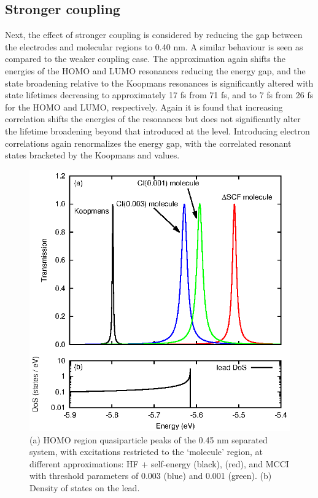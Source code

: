 \subsection{Stronger coupling}
Next, the effect of stronger coupling is considered by reducing the gap
between the electrodes and molecular regions to 0.40 nm.
A similar behaviour is seen as compared to the weaker coupling case. The
\dscf approximation again shifts the energies of the HOMO and LUMO
resonances reducing the energy gap, and the state broadening relative to
the Koopmans resonances is significantly altered with state lifetimes
decreasing to approximately 17 fs from 71 fs, and to 7 fs from 26 fs for
the HOMO and LUMO, respectively.
Again it is found that increasing correlation shifts the energies of the
resonances but does not significantly alter the lifetime broadening beyond
that introduced at the \dscf level. Introducing electron correlations
again renormalizes the energy gap, with the correlated resonant states
bracketed by the Koopmans and \dscf values.

\begin{figure}
	\begin{center}
		\includegraphics[width=0.9\linewidth]{figures/figure4a_4b}
	\end{center}
	\caption{(a) HOMO region quasiparticle peaks of the 0.45 nm separated
	         system, with excitations restricted to the `molecule' region,
		 at different approximations: HF + self-energy (black),
		 \dscf (red), and MCCI with threshold parameters of
		 0.003 (blue) and 0.001 (green). (b) Density of states on the
		 lead.}
	\label{fig:all45Ahomo}
\end{figure}

